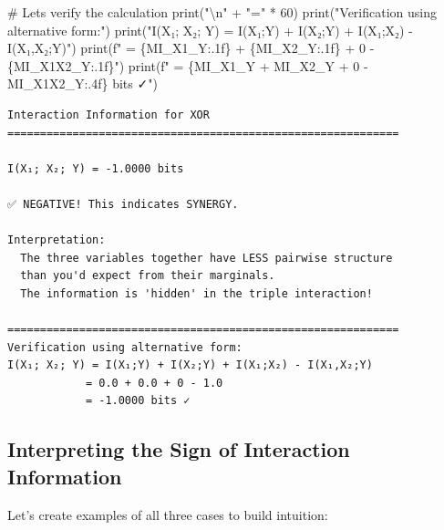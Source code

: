 \documentclass[
  11pt,
  letterpaper,
  oneside,
  openany]{book}
\newenvironment{Shaded}{\begin{snugshade}}{\end{snugshade}}
\newcommand{\BuiltInTok}[1]{\textcolor[rgb]{0.00,0.23,0.31}{#1}}
\newcommand{\CharTok}[1]{\textcolor[rgb]{0.13,0.47,0.30}{#1}}
\newcommand{\CommentTok}[1]{\textcolor[rgb]{0.37,0.37,0.37}{#1}}
\newcommand{\DecValTok}[1]{\textcolor[rgb]{0.68,0.00,0.00}{#1}}
\newcommand{\NormalTok}[1]{\textcolor[rgb]{0.00,0.23,0.31}{#1}}
\newcommand{\OperatorTok}[1]{\textcolor[rgb]{0.37,0.37,0.37}{#1}}
\newcommand{\SpecialCharTok}[1]{\textcolor[rgb]{0.37,0.37,0.37}{#1}}
\newcommand{\SpecialStringTok}[1]{\textcolor[rgb]{0.13,0.47,0.30}{#1}}
\newcommand{\StringTok}[1]{\textcolor[rgb]{0.13,0.47,0.30}{#1}}
\begin{document}
\begin{Shaded}
\begin{Highlighting}[]
\CommentTok{\# Let\textquotesingle{}s verify the calculation}
\BuiltInTok{print}\NormalTok{(}\StringTok{"}\CharTok{\textbackslash{}n}\StringTok{"} \OperatorTok{+} \StringTok{"="} \OperatorTok{*} \DecValTok{60}\NormalTok{)}
\BuiltInTok{print}\NormalTok{(}\StringTok{"Verification using alternative form:"}\NormalTok{)}
\BuiltInTok{print}\NormalTok{(}\StringTok{"I(X₁; X₂; Y) = I(X₁;Y) + I(X₂;Y) + I(X₁;X₂) {-} I(X₁,X₂;Y)"}\NormalTok{)}
\BuiltInTok{print}\NormalTok{(}\SpecialStringTok{f"            = }\SpecialCharTok{\{}\NormalTok{MI\_X1\_Y}\SpecialCharTok{:.1f\}}\SpecialStringTok{ + }\SpecialCharTok{\{}\NormalTok{MI\_X2\_Y}\SpecialCharTok{:.1f\}}\SpecialStringTok{ + 0 {-} }\SpecialCharTok{\{}\NormalTok{MI\_X1X2\_Y}\SpecialCharTok{:.1f\}}\SpecialStringTok{"}\NormalTok{)}
\BuiltInTok{print}\NormalTok{(}\SpecialStringTok{f"            = }\SpecialCharTok{\{}\NormalTok{MI\_X1\_Y }\OperatorTok{+}\NormalTok{ MI\_X2\_Y }\OperatorTok{+} \DecValTok{0} \OperatorTok{{-}}\NormalTok{ MI\_X1X2\_Y}\SpecialCharTok{:.4f\}}\SpecialStringTok{ bits ✓"}\NormalTok{)}
\end{Highlighting}
\end{Shaded}

\begin{verbatim}
Interaction Information for XOR
============================================================

I(X₁; X₂; Y) = -1.0000 bits

✅ NEGATIVE! This indicates SYNERGY.

Interpretation:
  The three variables together have LESS pairwise structure
  than you'd expect from their marginals.
  The information is 'hidden' in the triple interaction!

============================================================
Verification using alternative form:
I(X₁; X₂; Y) = I(X₁;Y) + I(X₂;Y) + I(X₁;X₂) - I(X₁,X₂;Y)
            = 0.0 + 0.0 + 0 - 1.0
            = -1.0000 bits ✓
\end{verbatim}

\subsection{Interpreting the Sign of Interaction
Information}\label{interpreting-the-sign-of-interaction-information}

Let's create examples of all three cases to build intuition:
\end{document}
